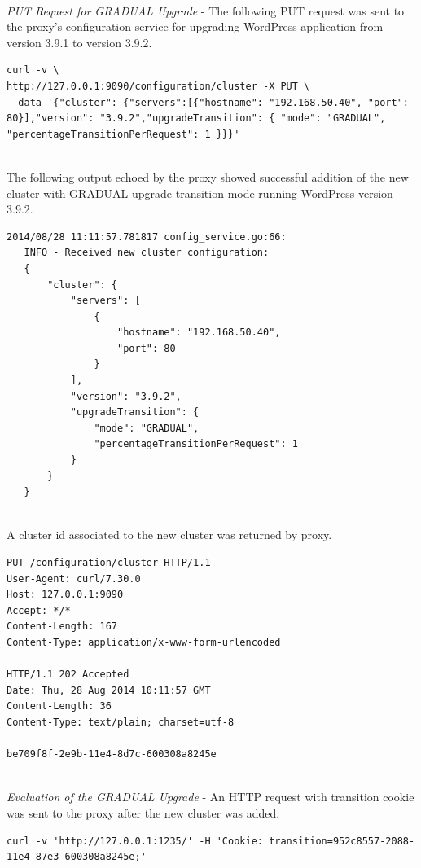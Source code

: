 \documentclass[a4paper,11pt,twoside]{report}
\begin{document}
\noindent\\
\textit{PUT Request for GRADUAL Upgrade} - The following PUT request was sent to the proxy's configuration service for upgrading WordPress application from version 3.9.1 to version 3.9.2.\smallskip

\begin{lstlisting}[language=terminal]
curl -v \
http://127.0.0.1:9090/configuration/cluster -X PUT \
--data '{"cluster": {"servers":[{"hostname": "192.168.50.40", "port": 80}],"version": "3.9.2","upgradeTransition": { "mode": "GRADUAL", "percentageTransitionPerRequest": 1 }}}'
\end{lstlisting}
 
\noindent \\
The following output echoed by the proxy showed successful addition of the new cluster with GRADUAL upgrade transition mode running WordPress version 3.9.2. \smallskip

\begin{lstlisting}[language=terminal]
2014/08/28 11:11:57.781817 config_service.go:66:     
   INFO - Received new cluster configuration:
   {
       "cluster": {
           "servers": [
               {
                   "hostname": "192.168.50.40", 
                   "port": 80
               }
           ], 
           "version": "3.9.2", 
           "upgradeTransition": {
               "mode": "GRADUAL", 
               "percentageTransitionPerRequest": 1
           }
       }
   }
\end{lstlisting}

\noindent\\ 
A cluster id associated to the new cluster was returned by proxy.\smallskip

\begin{lstlisting}[language=terminal]
PUT /configuration/cluster HTTP/1.1
User-Agent: curl/7.30.0
Host: 127.0.0.1:9090
Accept: */*
Content-Length: 167
Content-Type: application/x-www-form-urlencoded
 
HTTP/1.1 202 Accepted
Date: Thu, 28 Aug 2014 10:11:57 GMT
Content-Length: 36
Content-Type: text/plain; charset=utf-8
 
be709f8f-2e9b-11e4-8d7c-600308a8245e
\end{lstlisting}

\noindent\\
\textit{Evaluation of the GRADUAL Upgrade} - An HTTP request with transition cookie was sent to the proxy after the new cluster was added.\smallskip

\begin{lstlisting}[language=terminal]
curl -v 'http://127.0.0.1:1235/' -H 'Cookie: transition=952c8557-2088-11e4-87e3-600308a8245e;'
\end{lstlisting}
\end{document}
